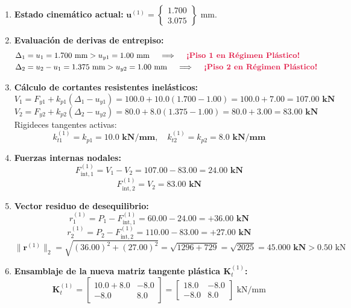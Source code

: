 \documentclass[11pt,letterpaper]{article}
\begin{document}
\begin{stepbox}
\begin{enumerate}
    \item \textbf{Estado cinemático actual:} $\mathbf{u}^{(1)} = \begin{Bmatrix} 1.700 \\ 3.075 \end{Bmatrix}\text{ mm}$.
    \item \textbf{Evaluación de derivas de entrepiso:}
    \begin{align*}
        \Delta_1 &= u_1 = 1.700\text{ mm} > u_{y1} = 1.00\text{ mm} \quad \implies \quad \text{\bfseries\color{uisrose} ¡Piso 1 en Régimen Plástico!} \\
        \Delta_2 &= u_2 - u_1 = 1.375\text{ mm} > u_{y2} = 1.00\text{ mm} \quad \implies \quad \text{\bfseries\color{uisrose} ¡Piso 2 en Régimen Plástico!}
    \end{align*}
    \item \textbf{Cálculo de cortantes resistentes inelásticos:}
    \[
        V_1 = F_{y1} + k_{p1}(\Delta_1 - u_{y1}) = 100.0 + 10.0(1.700 - 1.00) = 100.0 + 7.00 = \mathbf{107.00\text{ kN}}
    \]
    \[
        V_2 = F_{y2} + k_{p2}(\Delta_2 - u_{y2}) = 80.0 + 8.0(1.375 - 1.00) = 80.0 + 3.00 = \mathbf{83.00\text{ kN}}
    \]
    Rigideces tangentes activas:
    \[
        k_{t1}^{(1)} = k_{p1} = \mathbf{10.0\text{ kN/mm}}, \quad k_{t2}^{(1)} = k_{p2} = \mathbf{8.0\text{ kN/mm}}
    \]
    \item \textbf{Fuerzas internas nodales:}
    \[
        F_{\text{int},1}^{(1)} = V_1 - V_2 = 107.00 - 83.00 = \mathbf{24.00\text{ kN}}
    \]
    \[
        F_{\text{int},2}^{(1)} = V_2 = \mathbf{83.00\text{ kN}}
    \]
    \item \textbf{Vector residuo de desequilibrio:}
    \[
        r_1^{(1)} = P_1 - F_{\text{int},1}^{(1)} = 60.00 - 24.00 = \mathbf{+36.00\text{ kN}}
    \]
    \[
        r_2^{(1)} = P_2 - F_{\text{int},2}^{(1)} = 110.00 - 83.00 = \mathbf{+27.00\text{ kN}}
    \]
    \[
        \|\mathbf{r}^{(1)}\|_2 = \sqrt{(36.00)^2 + (27.00)^2} = \sqrt{1296 + 729} = \sqrt{2025} = \mathbf{45.000\text{ kN}} > 0.50\text{ kN}
    \]
    \item \textbf{Ensamblaje de la nueva matriz tangente plástica $\mathbf{K}_t^{(1)}$:}
    \[
        \mathbf{K}_t^{(1)} = \begin{bmatrix} 10.0 + 8.0 & -8.0 \\ -8.0 & 8.0 \end{bmatrix} = \begin{bmatrix} \mathbf{18.0} & \mathbf{-8.0} \\ \mathbf{-8.0} & \mathbf{8.0} \end{bmatrix}\text{ kN/mm}
\]
\end{enumerate}
\end{stepbox}
\end{document}
